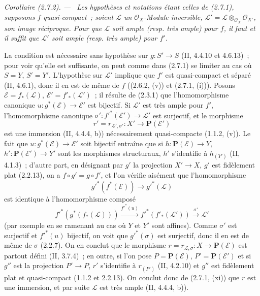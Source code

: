\documentclass[10pt,oneside]{book}
\newenvironment{corollary}[1][]{%
  \par\medskip\noindent\itshape Corollaire (#1). ---\ }{\par}
\begin{document}
\begin{corollary}[2.7.2]
\label{IV.2.7.2-fr}
Les hypothèses et notations étant celles de (2.7.1), supposons $f$
quasi-compact~; soient $\mathcal L$ un $\mathcal O_X$-Module inversible,
$\mathcal L'=\mathcal L\otimes_{\mathcal O_X}\mathcal O_{X'}$, son image
réciproque. Pour que $\mathcal L$ soit ample (resp. très ample) pour $f$, il
faut et il suffit que $\mathcal L'$ soit ample (resp. très ample) pour $f'$.
\end{corollary}

La condition est nécessaire sans hypothèse sur $g:S'\to S$ (II, 4.4.10 et
4.6.13)~; pour voir qu'elle est suffisante, on peut comme dans (2.7.1) se
limiter au cas où $S=Y$, $S'=Y'$. L'hypothèse sur $\mathcal L'$ implique que
$f'$ est quasi-compact et séparé (II, 4.6.1), donc il en est de même de $f$
((2.6.2, (v)) et (2.7.1, (i))). Posons
$\mathcal E=f_*(\mathcal L)$, $\mathcal E'=f'_*(\mathcal L')$~; il résulte
de (2.3.1) que l'homomorphisme canonique
$u:g^*(\mathcal E)\to\mathcal E'$ est bijectif. Si $\mathcal L'$ est très
ample pour $f'$, l'homomorphisme canonique
$\sigma':f'^*(\mathcal E')\to\mathcal L'$ est surjectif, et le morphisme
\[
r'=r_{\mathcal L',\sigma'}:X'\longrightarrow\mathbf P(\mathcal E')
\]
est une immersion (II, 4.4.4, b)) nécessairement quasi-compacte (1.1.2,
(v)). Le fait que $u:g^*(\mathcal E)\to\mathcal E'$ soit bijectif entraîne
que si $h:\mathbf P(\mathcal E)\to Y$, $h':\mathbf P(\mathcal E')\to Y'$
sont les morphismes structuraux, $h'$ s'identifie à $h_{(Y')}$ (II, 4.1.3)~;
d'autre part, en désignant par $g'$ la projection $X'\to X$, $g'$ est
fidèlement plat (2.2.13), on a $f\circ g'=g\circ f'$, et l'on vérifie
aisément que l'homomorphisme
\[
g'^*(f^*(\mathcal E))\longrightarrow g'^*(\mathcal L)
\]
est identique à l'homomorphisme composé
\[
f'^*(g^*(f_*(\mathcal L)))\xrightarrow{f'^*(u)}
f'^*(f'_*(\mathcal L'))\xrightarrow{\sigma'}\mathcal L'
\]
(par exemple en se ramenant au cas où $Y$ et $Y'$ sont affines). Comme
$\sigma'$ est surjectif et $f'^*(u)$ bijectif, on voit que
$g'^*(\sigma)$ est surjectif, donc il en est de même de $\sigma$ (2.2.7).
On en conclut que le morphisme
$r=r_{\mathcal L,\sigma}:X\to\mathbf P(\mathcal E)$ est partout défini
(II, 3.7.4)~; en outre, si l'on pose $P=\mathbf P(\mathcal E)$,
$P'=\mathbf P(\mathcal E')$ et si $g''$ est la projection $P'\to P$, $r'$
s'identifie à $r_{(P')}$ (II, 4.2.10) et $g''$ est fidèlement plat et
quasi-compact (1.1.2 et 2.2.13). On conclut donc de (2.7.1, (xi)) que $r$ est
une immersion, et par suite $\mathcal L$ est très ample (II, 4.4.4, b)).
\end{document}
